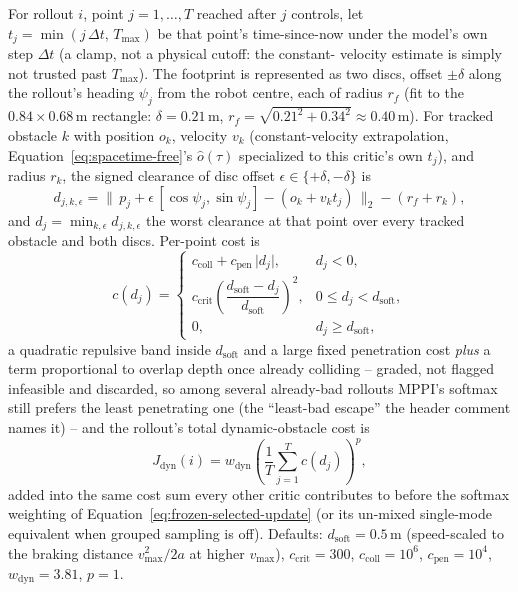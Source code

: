 \documentclass[11pt,a4paper]{article}
\begin{document}
For rollout $i$, point $j=1,\ldots,T$ reached after $j$ controls, let
$t_j=\min(j\,\Delta t,\,T_{\max})$ be that point's time-since-now under the
model's own step $\Delta t$ (a clamp, not a physical cutoff: the constant-
velocity estimate is simply not trusted past $T_{\max}$). The footprint is
represented as two discs, offset $\pm\delta$ along the rollout's heading
$\psi_j$ from the robot centre, each of radius $r_f$ (fit to the
$0.84\times0.68\,$m rectangle: $\delta=0.21\,$m, $r_f=\sqrt{0.21^2+0.34^2}
\approx0.40\,$m). For tracked obstacle $k$ with position $o_k$, velocity
$v_k$ (constant-velocity extrapolation, Equation~\eqref{eq:spacetime-free}'s
$\hat o(\tau)$ specialized to this critic's own $t_j$), and radius $r_k$,
the signed clearance of disc offset $\epsilon\in\{+\delta,-\delta\}$ is
\begin{equation}
  d_{j,k,\epsilon}=
  \bigl\lVert\, p_j+\epsilon\,[\cos\psi_j,\sin\psi_j]-(o_k+v_k t_j)\,\bigr\rVert_2
  -(r_f+r_k),
  \label{eq:dynobs-clearance}
\end{equation}
and $d_j=\min_{k,\epsilon}d_{j,k,\epsilon}$ the worst clearance at that point
over every tracked obstacle and both discs. Per-point cost is
\begin{equation}
  c(d_j)=
  \begin{cases}
    c_{\mathrm{coll}}+c_{\mathrm{pen}}\,\lvert d_j\rvert, & d_j<0,\\[4pt]
    c_{\mathrm{crit}}\left(\dfrac{d_{\mathrm{soft}}-d_j}{d_{\mathrm{soft}}}\right)^{2}, & 0\le d_j<d_{\mathrm{soft}},\\[6pt]
    0, & d_j\ge d_{\mathrm{soft}},
  \end{cases}
  \label{eq:dynobs-cost}
\end{equation}
a quadratic repulsive band inside $d_{\mathrm{soft}}$ and a large fixed
penetration cost \emph{plus} a term proportional to overlap depth once
already colliding -- graded, not flagged infeasible and discarded, so among
several already-bad rollouts MPPI's softmax still prefers the least
penetrating one (the ``least-bad escape'' the header comment names it) --
and the rollout's total dynamic-obstacle cost is
\begin{equation}
  J_{\mathrm{dyn}}(i)=w_{\mathrm{dyn}}\left(\frac{1}{T}\sum_{j=1}^{T}c(d_j)\right)^{p},
  \label{eq:dynobs-total}
\end{equation}
added into the same cost sum every other critic contributes to before the
softmax weighting of Equation~\eqref{eq:frozen-selected-update} (or its
un-mixed single-mode equivalent when grouped sampling is off). Defaults:
$d_{\mathrm{soft}}=0.5\,$m (speed-scaled to the braking distance
$v_{\max}^2/2a$ at higher $v_{\max}$), $c_{\mathrm{crit}}=300$,
$c_{\mathrm{coll}}=10^6$, $c_{\mathrm{pen}}=10^4$, $w_{\mathrm{dyn}}=3.81$,
$p=1$.
\end{document}
